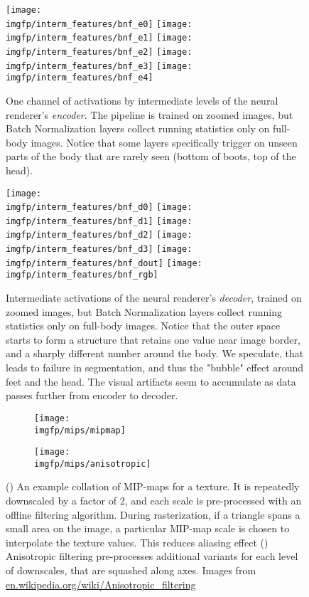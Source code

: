 \begin{figure}
	\centering
	\texttt{[image: \\imgfp/interm\_features/bnf\_e0]}%
	\hfill\texttt{[image: \\imgfp/interm\_features/bnf\_e1]}%
	\hfill\texttt{[image: \\imgfp/interm\_features/bnf\_e2]}%
	\hfill\texttt{[image: \\imgfp/interm\_features/bnf\_e3]}%
	\hfill\texttt{[image: \\imgfp/interm\_features/bnf\_e4]}%
	\caption{One channel of activations by intermediate levels of the neural renderer's \textit{encoder}. The pipeline is trained on zoomed images, but Batch Normalization layers collect running statistics only on full-body images. Notice that some layers specifically trigger on unseen parts of the body that are rarely seen (bottom of boots, top of the head).}
	\label{fig:interm06_encoder}
\end{figure}
\begin{figure}
	\centering
	\texttt{[image: \\imgfp/interm\_features/bnf\_d0]}%
	\hfill\texttt{[image: \\imgfp/interm\_features/bnf\_d1]}%
	\hfill\texttt{[image: \\imgfp/interm\_features/bnf\_d2]}%
	\hfill\texttt{[image: \\imgfp/interm\_features/bnf\_d3]}%
	\hfill\texttt{[image: \\imgfp/interm\_features/bnf\_dout]}%
	\hfill\texttt{[image: \\imgfp/interm\_features/bnf\_rgb]}%
	\caption{Intermediate activations of the neural renderer's \textit{decoder}, trained on zoomed images, but Batch Normalization layers collect running statistics only on full-body images. Notice that the outer space starts to form a structure that retains one value near image border, and a sharply different number around the body. We speculate, that leads to failure in segmentation, and thus the "bubble" effect around feet and the head. The visual artifacts seem to accumulate as data passes further from encoder to decoder. }
	\label{fig:interm06_decoder}
\end{figure}
\begin{figure}
	\centering
	\begin{subfigure}[b]{0.48\textwidth}
		\centering
		\texttt{[image: \\imgfp/mips/mipmap]}%
		\caption{}
		\label{fig:mipmap}
	\end{subfigure}
	\hfill
	\begin{subfigure}[b]{0.48\textwidth}
		\centering
		\texttt{[image: \\imgfp/mips/anisotropic]}
		\caption{}
		\label{fig:anisotropic}
	\end{subfigure}
	\caption{(\protect{}) An example collation of MIP-maps for a texture. It is repeatedly downscaled by a factor of 2, and each scale is pre-processed with an offline filtering algorithm. During rasterization, if a triangle spans a small area on the image, a particular MIP-map scale is chosen to interpolate the texture values. This reduces aliasing effect (\protect{}) Anisotropic filtering pre-processes additional variants for each level of downscales, that are squashed along axes. Images from \href{https://en.wikipedia.org/wiki/Anisotropic_filtering}{en.wikipedia.org/wiki/Anisotropic\_filtering}} 
\end{figure}
